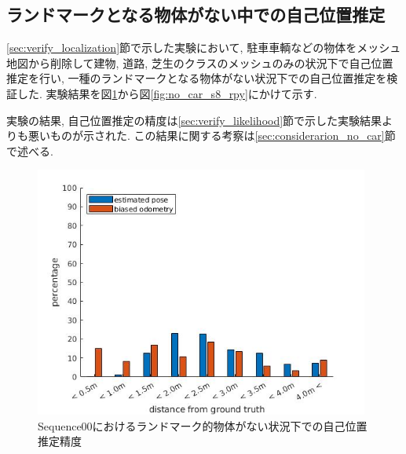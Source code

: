 \subsection{ランドマークとなる物体がない中での自己位置推定}\label{verify_without_car}
\ref{sec:verify_localization}節で示した実験において, 駐車車輌などの物体をメッシュ地図から削除して建物, 道路, 芝生のクラスのメッシュのみの状況下で自己位置推定を行い, 一種のランドマークとなる物体がない状況下での自己位置推定を検証した. 実験結果を図\ref{fig:no_car_s0_xyz}から図\ref{fig:no_car_s8_rpy}にかけて示す. \par 
実験の結果, 自己位置推定の精度は\ref{sec:verify_likelihood}節で示した実験結果よりも悪いものが示された. この結果に関する考察は\ref{sec:considerarion_no_car}節で述べる.

\begin{figure}[htbp]
 \begin{minipage}{1.0\hsize}
  \begin{center}
   \includegraphics[width=110mm]{./picture/no_car_s0_xyz.jpg}
  \end{center}
  \caption{Sequence00におけるランドマーク的物体がない状況下での自己位置推定精度}
  \label{fig:no_car_s0_xyz}
 \end{minipage}
\end{figure}

